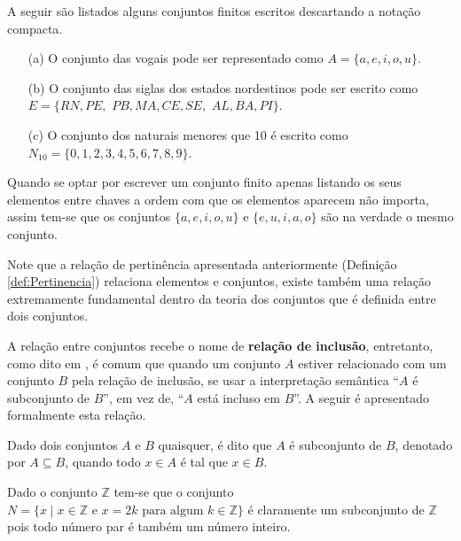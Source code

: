 \begin{example}
	A seguir são listados alguns conjuntos finitos escritos descartando a notação compacta.
	\begin{itemize}
		\item[(a)] O conjunto das vogais pode ser representado como $A = \{a,e,i,o,u\}$.
		\item[(b)] O conjunto das siglas dos estados nordestinos pode ser escrito como $E = \{RN, PE,$ $PB, MA, CE, SE,$ $AL, BA, PI\}$.
		\item[(c)] O conjunto dos naturais menores que 10 é escrito como $N_{10} = \{0, 1, 2, 3, 4, 5, 6, 7, 8, 9\}$.
	\end{itemize}
\end{example}

\begin{remark}
	Quando se optar por escrever um conjunto finito apenas listando os seus elementos entre chaves a ordem com que os elementos aparecem não importa, assim tem-se que os conjuntos $\{a, e, i, o , u\}$ e $\{e, u, i, a, o\}$ são na verdade o mesmo conjunto.
\end{remark}

Note que a relação de pertinência  apresentada anteriormente (Definição \ref{def:Pertinencia}) relaciona elementos e conjuntos, existe também uma relação extremamente fundamental dentro da teoria dos conjuntos que é definida entre dois conjuntos. 

A relação entre conjuntos recebe o nome de \textbf{relação de inclusão}, entretanto, como dito em \cite{lipschutz1978-TC}, é comum que quando um conjunto $A$ estiver relacionado com um conjunto $B$ pela relação de inclusão, se usar a interpretação semântica ``$A$ é subconjunto de $B$'', em vez de, ``$A$ está incluso em $B$''. A seguir é apresentado formalmente esta relação.

\begin{definition}\label{def:RelacaoInclusao}
	Dado dois conjuntos $A$ e $B$ quaisquer, é dito que $A$ é subconjunto de $B$, denotado por $A \subseteq B$, quando todo $x \in A$ é tal que $x \in B$.
\end{definition}

\begin{example}\label{exe:ConjuntoHerdeiro}
	Dado o conjunto $\mathbb{Z}$ tem-se que o conjunto $N = \{x \mid x \in \mathbb{Z} \mbox{ e } x = 2k \mbox{ para algum } k \in \mathbb{Z}\}$ é claramente um subconjunto de $\mathbb{Z}$ pois todo número par é também um número inteiro.
\end{example}

